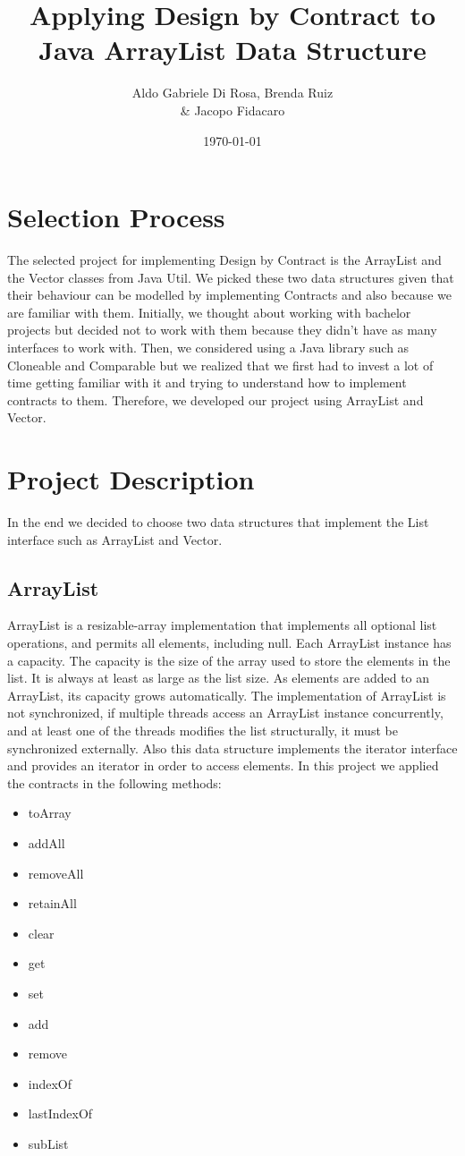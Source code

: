 \documentclass[a4paper]{article}
\title{Applying Design by Contract to \\ Java ArrayList Data Structure}
\author{Aldo Gabriele Di Rosa, Brenda Ruiz \\ \& Jacopo Fidacaro}
\date{\today}
\begin{document}
\maketitle

\section{Selection Process}

The selected project for implementing Design by Contract is the ArrayList and the Vector classes from Java Util. We picked these two data structures given that their behaviour can be modelled by implementing Contracts and also because we are familiar with them. Initially, we thought about working with bachelor projects but decided not to work with them because they didn't have as many interfaces to work with. Then, we considered using a Java library such as Cloneable and Comparable but we realized that we first had to invest a lot of time getting familiar with it and trying to understand how to implement contracts to them. Therefore, we developed our project using ArrayList and Vector.


\section{Project Description}
In the end we decided to choose two data structures that implement the List interface such as ArrayList and Vector. 
\subsection{ArrayList}
ArrayList is a resizable-array implementation that implements all optional list operations, and permits all elements, including null. 
Each ArrayList instance has a capacity. The capacity is the size of the array used to store the elements in the list. It is always at least as large as the list size. As elements are added to an ArrayList, its capacity grows automatically. 
The implementation of ArrayList is not synchronized, if multiple threads access an ArrayList instance concurrently, and at least one of the threads modifies the list structurally, it must be synchronized externally.
Also this data structure implements the iterator interface and provides an iterator in order to access elements. In this project we applied the contracts in the following methods:
\begin{itemize}
	\item toArray
	\item addAll
	\item removeAll
	\item retainAll
	\item clear
	\item get
	\item set 
	\item add
	\item remove
	\item indexOf
	\item lastIndexOf
	\item subList
\end{itemize}
\end{document}
